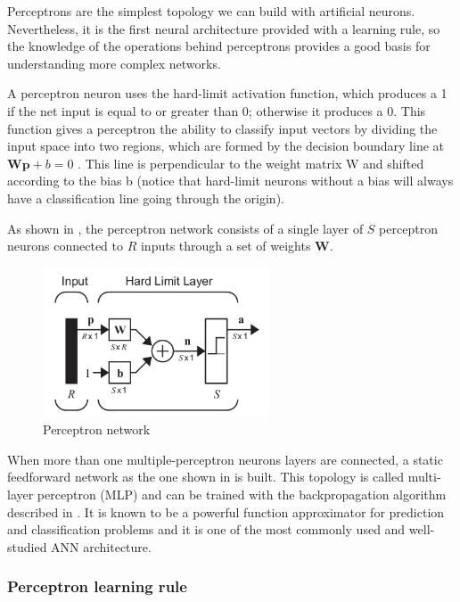 
\label{subsec:ANN:perceptron}

Perceptrons are the simplest topology we can build with artificial neurons. 
Nevertheless, it is the first neural architecture provided with a learning rule,
so the knowledge of the operations behind perceptrons provides a good
basis for understanding more complex networks.

A perceptron neuron uses the hard-limit activation function, which produces a 1 if the net input is equal to or greater than 0; otherwise it produces a 0. 
This function gives a perceptron the ability to classify input vectors by dividing the input space into two regions, which are formed by the decision boundary line at $\mathbf{Wp} + b = 0$ \cite{demuth2008neural}. 
This line is perpendicular to the weight matrix W and shifted according to the bias b 
(notice that hard-limit neurons without a bias will always have a classification line going through the origin).

As shown in , the perceptron network consists of a single layer of 
$S$ perceptron neurons connected to $R$ inputs through a set of weights $\mathbf{W}$. 

\begin{figure}[!ht]
\centering
\includegraphics[width=0.6\textwidth]{images/perceptron.png}
\caption{Perceptron network}
\label{fig:perceptron}
\end{figure}

When more than one multiple-perceptron neurons layers are connected, a static feedforward network as the one shown in  is built. 
This topology is called multi-layer perceptron (MLP) and can be trained with the backpropagation algorithm described in . 
It is known to be a powerful function approximator for prediction and classification problems and it is one of the most commonly used and well-studied ANN architecture.


\subsubsection{Perceptron learning rule}
\label{subsubsec:percpetrontraining}

